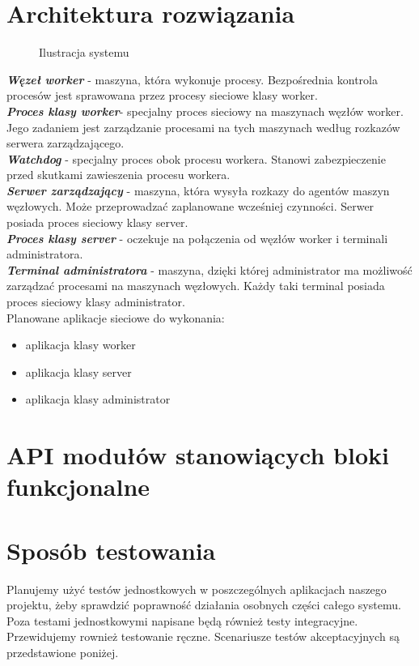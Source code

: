\documentclass[paper=a4, fontsize=11pt]{scrartcl} %
\begin{document}
\section*{Architektura rozwiązania}
\begin{figure}[H]
    \centering
    \def\svgwidth{0.5\columnwidth}
    
    \caption{Ilustracja systemu}\label{visina8}
\end{figure}
\textbf{\textit{Węzeł worker}} - maszyna, która wykonuje procesy. Bezpośrednia kontrola procesów jest sprawowana przez procesy sieciowe klasy worker.\\
\textbf{\textit{Proces klasy worker}}- specjalny proces sieciowy na maszynach węzłów worker. Jego zadaniem jest zarządzanie procesami na tych maszynach według rozkazów serwera zarządzającego.\\
\textbf{\textit{Watchdog}} - specjalny proces obok procesu workera. Stanowi zabezpieczenie przed skutkami zawieszenia procesu workera. \\
\textbf{\textit{Serwer zarządzający}} - maszyna, która wysyła rozkazy do agentów maszyn węzłowych. Może przeprowadzać zaplanowane wcześniej czynności. Serwer posiada proces sieciowy klasy server.\\
\textbf{\textit{Proces klasy server}} - oczekuje na połączenia od węzłów worker i terminali administratora.\\
\textbf{\textit{Terminal administratora}} - maszyna, dzięki której administrator ma możliwość zarządzać procesami na maszynach węzłowych. Każdy taki terminal posiada proces sieciowy klasy administrator.\\

Planowane aplikacje sieciowe do wykonania:
\begin{itemize}
\item aplikacja klasy worker
\item aplikacja klasy server
\item aplikacja klasy administrator
\end{itemize}

\section*{API modułów stanowiących bloki funkcjonalne}

\section*{Sposób testowania} 
Planujemy użyć testów jednostkowych w poszczególnych aplikacjach naszego projektu, żeby sprawdzić poprawność działania osobnych części całego systemu. Poza testami jednostkowymi napisane będą również testy integracyjne. Przewidujemy rownież testowanie ręczne. Scenariusze testów akceptacyjnych są przedstawione poniżej.
\end{document}

